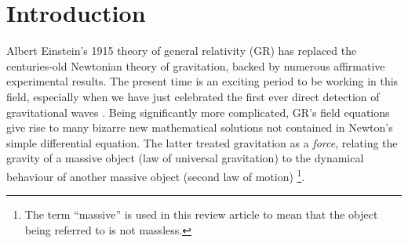 \documentclass[aps,pre,preprint,superscriptaddress,showpacs,showkeys]{revtex4-1}
\begin{document}

\maketitle


\section{Introduction}\label{Section1}

Albert Einstein's 1915 theory of general relativity (GR) has replaced the centuries-old Newtonian theory of gravitation, backed by numerous affirmative experimental results. The present time is an exciting period to be working in this field, especially when we have just celebrated the first ever direct detection of gravitational waves \cite{LIGO,LIGO2}. Being significantly more complicated, GR's field equations give rise to many bizarre new mathematical solutions not contained in Newton's simple differential equation. The latter treated gravitation as a \emph{force}, relating the gravity of a massive object (law of universal gravitation) to the dynamical behaviour of another massive object (second law of motion) \footnote{The term ``massive'' is used in this review article to mean that the object being referred to is not massless.}.
\end{document}
